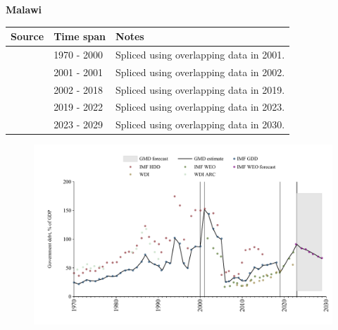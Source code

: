 \documentclass[12pt,a4paper,landscape]{article}
\begin{document}
\begin{adjustbox}{max totalsize={\paperwidth}{\paperheight},center}
\begin{minipage}[t][\textheight][t]{\textwidth}
\vspace*{0.5cm}
{}
\begin{center}
{\Large\bfseries Malawi}
\end{center}
\vspace{0.5cm}
\begin{table}[H]
\centering
\small
\begin{tabular}{|l|l|l|}
\hline
\textbf{Source} & \textbf{Time span} & \textbf{Notes} \\
\hline
\rowcolor{white}\cite{IMF_GDD}& 1970 - 2000 &Spliced using overlapping data in 2001.\\
\rowcolor{lightgray}\cite{IMF_HDD}& 2001 - 2001 &Spliced using overlapping data in 2002.\\
\rowcolor{white}\cite{IMF_GDD}& 2002 - 2018 &Spliced using overlapping data in 2019.\\
\rowcolor{lightgray}\cite{IMF_WEO}& 2019 - 2022 &Spliced using overlapping data in 2023.\\
\rowcolor{white}\cite{IMF_WEO_forecast}& 2023 - 2029 &Spliced using overlapping data in 2030.\\
\hline
\end{tabular}
\end{table}
\begin{figure}[H]
\centering
\includegraphics[width=\textwidth,height=0.6\textheight,keepaspectratio]{graphs/MWI_govdebt_GDP.pdf}
\end{figure}
\end{minipage}
\end{adjustbox}
\end{document}
